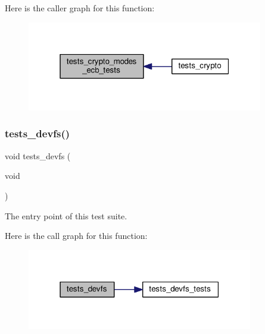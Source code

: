 Here is the caller graph for this function\+:
\nopagebreak
\begin{figure}[H]
\begin{center}
\leavevmode
\includegraphics[width=292pt]{group__unittests_ga76fd240d06e873ffb3cd5e75c7407de8_icgraph}
\end{center}
\end{figure}
\mbox{\label{group__unittests_ga03275129153bd3a312c96576f1c15526}} 
\subsubsection{\texorpdfstring{tests\+\_\+devfs()}{tests\_devfs()}}
{\footnotesize\ttfamily void tests\+\_\+devfs (\begin{DoxyParamCaption}\item[{void}]{ }\end{DoxyParamCaption})}



The entry point of this test suite. 

Here is the call graph for this function\+:
\nopagebreak
\begin{figure}[H]
\begin{center}
\leavevmode
\includegraphics[width=279pt]{group__unittests_ga03275129153bd3a312c96576f1c15526_cgraph}
\end{center}
\end{figure}
\mbox{\label{group__unittests_ga1161adbe65ee71e46440423762d1ed8b}} 
